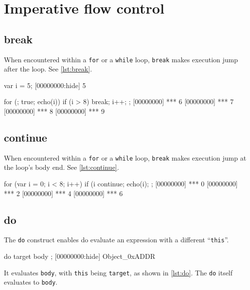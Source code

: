 \FloatBarrier
\section{Imperative flow control}

\subsection{break}

When encountered within a \lstinline|for| or a \lstinline|while| loop,
\lstinline|break| makes execution jump after the loop. See
\autoref{lst:break}.

\begin{urbiscript}[caption=Using break, label=lst:break,
  float=\floatpos]
var i = 5;
[00000000:hide] 5

for (; true; echo(i))
{
  if (i > 8)
    break;
  i++;
};
[00000000] *** 6
[00000000] *** 7
[00000000] *** 8
[00000000] *** 9
\end{urbiscript}

\subsection{continue}

When encountered within a \lstinline|for| or a \lstinline|while| loop,
\lstinline|break| makes execution jump at the loop's body end. See
\autoref{lst:continue}.

\begin{urbiscript}[caption=Using continue, label=lst:continue,
  float=\floatpos]
for (var i = 0; i < 8; i++)
{
  if (i %
    continue;
  echo(i);
};
[00000000] *** 0
[00000000] *** 2
[00000000] *** 4
[00000000] *** 6
\end{urbiscript}

\subsection{do}

The \lstinline|do| construct enables do evaluate an expression with a
different ``\lstinline|this|''.

\begin{urbiscript}[frame=, backgroundcolor=, ]
do target
{
  body
};
[00000000:hide] Object_0xADDR

\end{urbiscript}

It evaluates \lstinline|body|, with \lstinline|this| being
\lstinline|target|, as shown in \autoref{lst:do}.  The \lstinline|do| itself
evaluates to \lstinline|body|.

